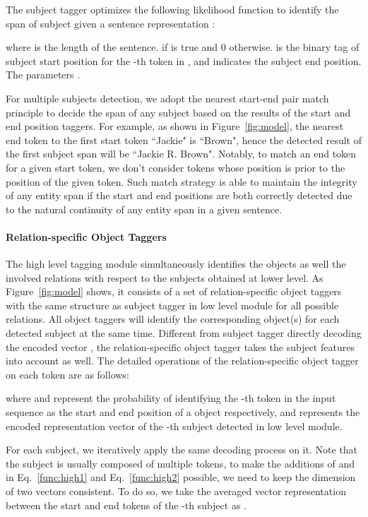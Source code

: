 \documentclass[11pt,a4paper]{article}
\begin{document}
\par The subject tagger optimizes the following likelihood function to identify the span of subject  given a sentence representation :

where  is the length of the sentence.  if  is true and 0 otherwise.  is the binary tag of subject start position for the -th token in , and  indicates the subject end position. The parameters .

\par For multiple subjects detection, we adopt the nearest start-end pair match principle to decide the span of any subject based on the results of the start and end position taggers. For example, as shown in Figure~\ref{fig:model}, the nearest end token to the first start token ``Jackie" is ``Brown", hence the detected result of the first subject span will be ``Jackie R. Brown". Notably, to match an end token for a given start token, we don't consider tokens whose position is prior to the position of the given token. Such match strategy is able to maintain the integrity of any entity span if the start and end positions are both correctly detected due to the natural continuity of any entity span in a given sentence.

\paragraph{Relation-specific Object Taggers} 
The high level tagging module simultaneously identifies the objects as well the involved relations with respect to the subjects obtained at lower level. As Figure~\ref{fig:model} shows, it consists of a set of relation-specific object taggers with the same structure as subject tagger in low level module for all possible relations. All object taggers will identify the corresponding object(s) for each detected subject at the same time. Different from subject tagger directly decoding the encoded vector , the relation-specific object tagger takes the subject features into account as well. The detailed operations of the relation-specific object tagger on each token are as follows:

where  and  represent the probability of identifying the -th token in the input sequence as the start and end position of a object respectively, and  represents the encoded representation vector of the -th subject detected in low level module.

\par For each subject, we iteratively apply the same decoding process on it. Note that the subject is usually composed of multiple tokens, to make the additions of  and  in Eq.~\eqref{func:high1} and Eq.~\eqref{func:high2} possible, we need to keep the dimension of two vectors consistent. To do so, we take the averaged vector representation between the start and end tokens of the -th subject as .
\end{document}
